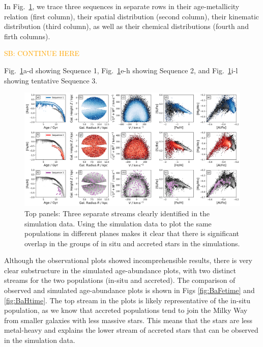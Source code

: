 \documentclass[fleqn,usenatbib]{mnras}
\newcommand{\SB}[1]{{\textcolor{orange}{SB: #1}}}
\begin{document}
In Fig.~\ref{fig:three_sequences_traced}, we trace three sequences in separate rows in their age-metallicity relation (first column), their spatial distribution (second column), their kinematic distribution (third column), as well as their chemical distributions (fourth and firth columns).

\SB{CONTINUE HERE}

Fig.~\ref{fig:three_sequences_traced}a-d showing Sequence 1, Fig.~\ref{fig:three_sequences_traced}e-h showing Sequence 2, and Fig.~\ref{fig:three_sequences_traced}i-l showing tentative Sequence 3.

\begin{figure}
	\includegraphics[width=\textwidth]{figures/three_sequences_traced.png}
    \caption{Top panels: Three separate streams clearly identified in the simulation data. Using the simulation data to plot the same populations in different planes makes it clear that there is significant overlap in the groups of in situ and accreted stars in the simulations.}
    \label{fig:three_sequences_traced}
\end{figure}







Although the observational plots showed incomprehensible results, there is very clear substructure in the simulated age-abundance plots, with two distinct streams for the two populations (in-situ and accreted). The comparison of observed and simulated age-abundance plots is shown in Figs \ref{fig:BaFetime} and \ref{fig:BaHtime}. The top stream in the plots is likely representative of the in-situ population, as we know that accreted populations tend to join the Milky Way from smaller galaxies with less massive stars. This means that the stars are less metal-heavy and explains the lower stream of accreted stars that can be observed in the simulation data.
\end{document}
